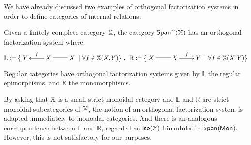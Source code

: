 We have already discussed two examples of orthogonal factorization systems in order to define categories of internal relations:
\begin{example}
Given a finitely complete category $\mathbb{X}$, the category $\mathsf{Span}^\sim(\mathbb{X})$ has an orthogonal factorization system where:
$$\mathbb{L}:=
\{\xymatrix{Y & X \ar@{=}[r] \ar[l]_{f } & X}    \  | \ \forall f \in \X(X,Y)  \}\ , \hspace*{.2cm}
\mathbb{R}:=
\{ \xymatrix{X & X \ar@{=}[l] \ar[r]^{f } & Y}    \  | \ \forall f \in \X(X,Y) \}
$$
\end{example}
\begin{example}
Regular categories have orthogonal factorization systems given by $\mathbb{L}$ the regular epimorphisms, and $\mathbb R$ the monomorphisms.
\end{example}
By asking that $\mathbb{X}$ is a small strict monoidal category and  $\mathbb{L}$ and $\mathbb{R}$ are strict monoidal subcategories of $\mathbb{X}$, the notion of an orthogonal factorization system is adapted immediately to monoidal categories. And there is an analogous correspondence  between $\mathbb{L}$ and $\mathbb{R}$, regarded as ${\sf Iso}(\mathbb{X})$-bimodules in $\mathsf{Span}({\sf Mon})$.  However, this is not satisfactory for our purposes.


